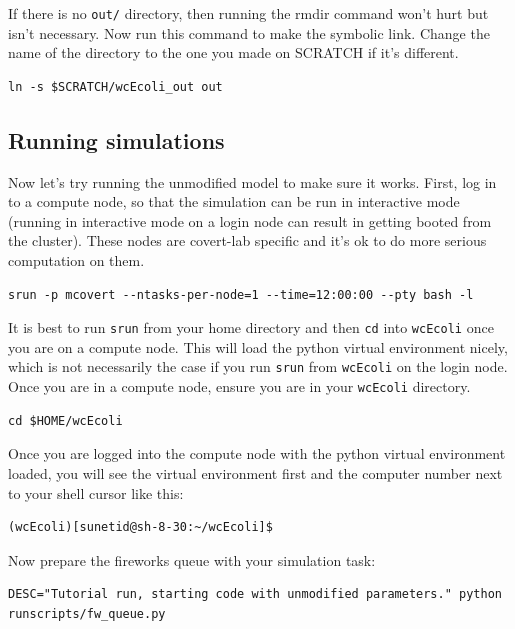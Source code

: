 \documentclass[12pt]{article}
\begin{document}
If there is no \texttt{out/} directory, then running the rmdir command won't hurt but isn't necessary. Now run this command to make the symbolic link. Change the name of the directory to the one you made on SCRATCH if it's different.

\lstset{language=bash}
\begin{lstlisting}
ln -s $SCRATCH/wcEcoli_out out
\end{lstlisting}

\subsection{Running simulations}

Now let's try running the unmodified model to make sure it works. First, log in to a compute node, so that the simulation can be run in interactive mode (running in interactive mode on a login node can result in getting booted from the cluster). These nodes are covert-lab specific and it's ok to do more serious computation on them.

\begin{lstlisting}
srun -p mcovert --ntasks-per-node=1 --time=12:00:00 --pty bash -l
\end{lstlisting}

It is best to run \texttt{srun} from your home directory and then \texttt{cd} into \texttt{wcEcoli} once you are on a compute node. This will load the python virtual environment nicely, which is not necessarily the case if you run \texttt{srun} from \texttt{wcEcoli} on the login node. Once you are in a compute node, ensure you are in your \texttt{wcEcoli} directory.

\begin{lstlisting}
cd $HOME/wcEcoli
\end{lstlisting}

Once you are logged into the compute node with the python virtual environment loaded, you will see the virtual environment first and the computer number next to your shell cursor like this:

\lstset{language=bash}
\begin{lstlisting}
(wcEcoli)[sunetid@sh-8-30:~/wcEcoli]$
\end{lstlisting}

Now prepare the fireworks queue with your simulation task:

\begin{lstlisting}
DESC="Tutorial run, starting code with unmodified parameters." python runscripts/fw_queue.py
\end{lstlisting}
\end{document}
